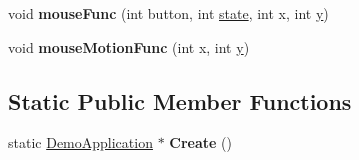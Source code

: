 \begin{DoxyCompactItemize}
\item 
\hypertarget{class_soft_demo_a66f9329ddc8b4182d74f57a1df989bf2}{void {\bfseries mouse\+Func} (int button, int \hyperlink{structstate}{state}, int x, int \hyperlink{_ice_utils_8h_aa7ffaed69623192258fb8679569ff9ba}{y})}\label{class_soft_demo_a66f9329ddc8b4182d74f57a1df989bf2}

\item 
\hypertarget{class_soft_demo_ab40aaadc194b01399c868c9cb0d428ac}{void {\bfseries mouse\+Motion\+Func} (int x, int \hyperlink{_ice_utils_8h_aa7ffaed69623192258fb8679569ff9ba}{y})}\label{class_soft_demo_ab40aaadc194b01399c868c9cb0d428ac}

\end{DoxyCompactItemize}
\subsection*{Static Public Member Functions}
\begin{DoxyCompactItemize}
\item 
\hypertarget{class_soft_demo_abae43fbc954d6f8685b682e50a3b5e8c}{static \hyperlink{class_demo_application}{Demo\+Application} $\ast$ {\bfseries Create} ()}\label{class_soft_demo_abae43fbc954d6f8685b682e50a3b5e8c}

\end{DoxyCompactItemize}
